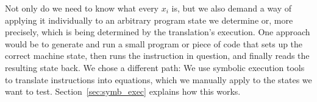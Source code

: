 Not only do we need to know what every $x_i$ is, but we also demand a way of applying it individually to an arbitrary
program state we determine or, more precisely, which is being determined by the translation's execution. One approach
would be to generate and run a small program or piece of code that sets up the correct machine state, then runs the
instruction in question, and finally reads the resulting state back. We chose a different path: We use symbolic
execution tools to translate instructions into equations, which we manually apply to the states we want to test.
Section~\ref{sec:symb_exec} explains how this works.

%
%
%

